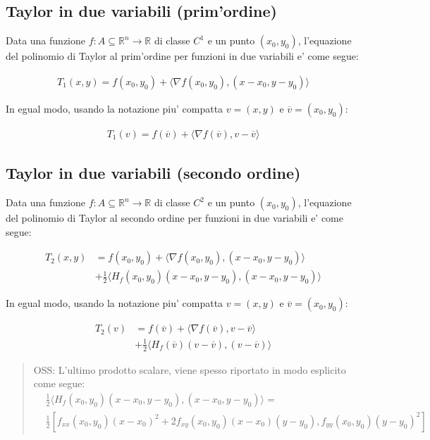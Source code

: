 \documentclass{article}
\begin{document}
\subsection{Taylor in due variabili (prim'ordine)}

Data una funzione $f: A \subseteq \mathbb{R}^n \to \mathbb{R}$ di classe $C^1$ e
un punto $(x_0, y_0)$, l'equazione del polinomio di Taylor al prim'ordine per
funzioni in due variabili e' come segue:

\begin{align*}
  T_1(x, y) = f(x_0, y_0) + \langle \nabla f(x_0, y_0), (x - x_0, y - y_0) \rangle
\end{align*}

In egual modo, usando la notazione piu' compatta $v = (x, y)$ e $\overline{v} = (x_0, y_0)$:

\begin{align*}
  T_1(v) = f(\overline{v}) + \langle \nabla f(\overline{v}), v - \overline{v} \rangle
\end{align*}

\subsection{Taylor in due variabili (secondo ordine)}

Data una funzione $f: A \subseteq \mathbb{R}^n \to \mathbb{R}$ di classe $C^2$ e
un punto $(x_0, y_0)$, l'equazione del polinomio di Taylor al secondo ordine per
funzioni in due variabili e' come segue:

\begin{align*}
  T_2(x, y) &= f(x_0, y_0) + \langle \nabla f(x_0, y_0), (x - x_0, y - y_0) \rangle \\
    &+ \frac{1}{2} \langle H_f(x_0, y_0) (x - x_0, y - y_0), (x - x_0, y - y_0) \rangle
\end{align*}

In egual modo, usando la notazione piu' compatta $v = (x, y)$ e $\overline{v} = (x_0, y_0)$:

\begin{align*}
  T_2(v) &= f(\overline{v}) + \langle \nabla f(\overline{v}), v - \overline{v} \rangle \\
    &+ \frac{1}{2} \langle H_f(\overline{v}) (v - \overline{v}), (v - \overline{v}) \rangle
\end{align*}

\begin{quote}
  OSS: L'ultimo prodotto scalare, viene spesso riportato in modo esplicito come segue:
  \begin{align*}
    &\frac{1}{2} \langle H_f(x_0, y_0) (x - x_0, y - y_0), (x - x_0, y - y_0) \rangle = \\
    &\frac{1}{2} [f_{xx}(x_0, y_0)(x-x_0)^2 + 2f_{xy}(x_0, y_0)(x-x_0)(y-y_0), f_{yy}(x_0, y_0)(y-y_0)^2]
  \end{align*}
\end{quote}
\end{document}
